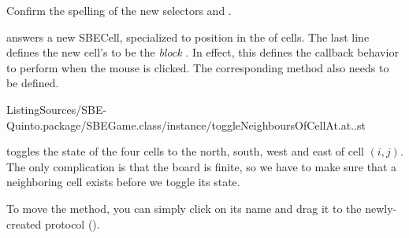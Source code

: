 \documentclass[a4paper,10pt,twoside]{book}
\begin{document}
Confirm the spelling of the new selectors  and .

 answers a new SBECell, specialized to position  in the  of cells.
The last line defines the new cell's  to be the \emph{block}
\mbox{.}
In effect, this defines the callback behavior to perform when the mouse is clicked.
The corresponding method also needs to be defined.

%
{ListingSources/SBE-Quinto.package/SBEGame.class/instance/toggleNeighboursOfCellAt.at..st}

 toggles the state of the four cells to the north, south, west and east of cell $(i, j)$.
The only complication is that the board is finite, so we have to make sure that a neighboring cell exists before we toggle its state.

To move the method, you can simply click on its name and drag it to the newly-created protocol ().
\end{document}
